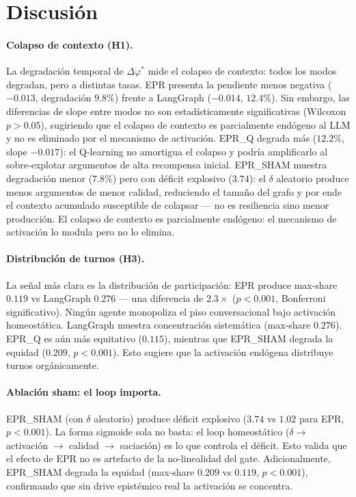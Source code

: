 \documentclass{llncs}
\begin{document}
\section{Discusi\'on}
\label{sec:discussion}

\paragraph{Colapso de contexto (H1).}
La degradaci\'on temporal de $\Delta\varphi^*$ mide el colapso de
contexto: todos los modos degradan, pero a distintas tasas. EPR presenta
la pendiente menos negativa ($-0.013$, degradaci\'on $9.8\%$) frente a
LangGraph ($-0.014$, $12.4\%$). Sin embargo, las diferencias de slope
entre modos no son estad\'isticamente significativas (Wilcoxon
$p>0.05$), sugiriendo que el colapso de contexto es parcialmente
end\'ogeno al LLM y no es eliminado por el mecanismo de activaci\'on.
EPR\_Q degrada m\'as ($12.2\%$, slope $-0.017$): el Q-learning no
amortigua el colapso y podr\'ia amplificarlo al sobre-explotar
argumentos de alta recompensa inicial. EPR\_SHAM muestra degradaci\'on
menor ($7.8\%$) pero con d\'eficit explosivo ($3.74$): el $\delta$
aleatorio produce menos argumentos de menor calidad, reduciendo el
tama\~no del grafo y por ende el contexto acumulado susceptible de
colapsar --- no es resiliencia sino menor producci\'on. El colapso de
contexto es parcialmente end\'ogeno: el mecanismo de activaci\'on lo
modula pero no lo elimina.

\paragraph{Distribuci\'on de turnos (H3).}
La se\~nal m\'as clara es la distribuci\'on de participaci\'on: EPR
produce max-share $0.119$ vs LangGraph $0.276$ --- una diferencia de
$2.3\times$ ($p<0.001$, Bonferroni significativo). Ning\'un agente
monopoliza el piso conversacional bajo activaci\'on homeost\'atica.
LangGraph muestra concentraci\'on sistem\'atica (max-share $0.276$).
EPR\_Q es a\'un m\'as equitativo ($0.115$), mientras que EPR\_SHAM
degrada la equidad ($0.209$, $p<0.001$). Esto sugiere que la
activaci\'on end\'ogena distribuye turnos org\'anicamente.

\paragraph{Ablaci\'on sham: el loop importa.}
EPR\_SHAM (con $\delta$ aleatorio) produce d\'eficit explosivo
($3.74$ vs $1.02$ para EPR, $p<0.001$). La forma sigmoide sola no
basta: el loop homeost\'atico ($\delta \to$ activaci\'on $\to$ calidad
$\to$ saciaci\'on) es lo que controla el d\'eficit. Esto valida que el
efecto de EPR no es artefacto de la no-linealidad del gate.
Adicionalmente, EPR\_SHAM degrada la equidad (max-share $0.209$ vs
$0.119$, $p<0.001$), confirmando que sin drive epist\'emico real la
activaci\'on se concentra.
\end{document}
